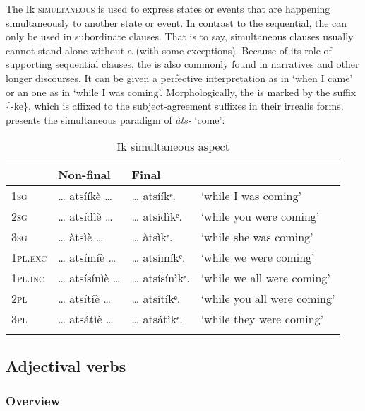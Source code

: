 The Ik \textsc{simultaneous}  is used to express states or events that are happening simultaneously to another state or event. In contrast to the sequential, the  can only be used in subordinate clauses. That is to say, simultaneous clauses usually cannot stand alone without a  (with some exceptions). Because of its role of supporting sequential clauses, the  is also commonly found in narratives and other longer discourses. It can be given a perfective interpretation as in ‘when I came’ or an  one as in ‘while I was coming’. Morphologically, the  is marked by the suffix \{-ke\}, which is affixed to the subject-agreement suffixes in their irrealis forms.  presents the simultaneous paradigm of \textit{àts-} ‘come’:


\begin{table}
\caption{Ik simultaneous aspect}
\label{tab:verbs:sim}


\begin{tabularx}{\textwidth}{XXXl}
\lsptoprule

& Non-final & Final & \\
\midrule
\textsc{1sg} & {\dots} atsííkè {\dots} & {\dots} atsííkᵉ. & ‘while I was coming’\\
\textsc{2sg} & {\dots} atsídìè {\dots} & {\dots} atsídìkᵉ. & ‘while you were coming’\\
\textsc{3sg} & {\dots} àtsìè {\dots} & {\dots} àtsìkᵉ. & ‘while she was coming’\\
\textsc{1pl.exc} & {\dots} atsímíè {\dots} & {\dots} atsímíkᵉ. & ‘while we were coming’\\
\textsc{1pl.inc} & {\dots} atsísínìè {\dots} & {\dots} atsísínìkᵉ. & ‘while we all were coming’\\
\textsc{2pl} & {\dots} atsítíè {\dots} & {\dots} atsítíkᵉ. & ‘while you all were coming’\\
\textsc{3pl} & {\dots} atsátìè {\dots} & {\dots} atsátìkᵉ. & ‘while they were coming’\\
\lspbottomrule
\end{tabularx}
\end{table}



\subsection{Adjectival verbs}\label{sec:8.11}
\subsubsection{Overview}\label{sec:8.11.1}

